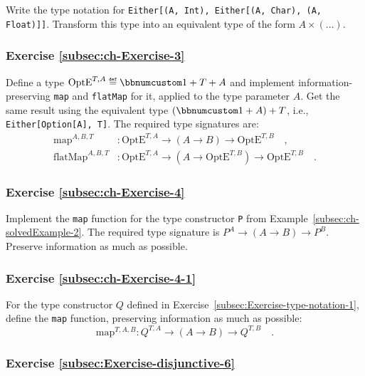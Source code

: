 Write the type notation for \lstinline!Either[(A, Int), Either[(A, Char), (A, Float)]]!.
Transform this type into an equivalent type of the form $A\times(...)$.

\subsubsection{Exercise \label{subsec:ch-Exercise-3}\ref{subsec:ch-Exercise-3}}

Define a type $\text{OptE}^{T,A}\triangleq\bbnum 1+T+A$ and implement
information-preserving \lstinline!map! and \lstinline!flatMap! for
it, applied to the type parameter $A$. Get the same result using
the equivalent type $(\bbnum 1+A)+T$, i.e., \lstinline!Either[Option[A], T]!.
The required type signatures are:
\begin{align*}
\text{map}^{A,B,T} & :\text{OptE}^{T,A}\rightarrow\left(A\rightarrow B\right)\rightarrow\text{OptE}^{T,B}\quad,\\
\text{flatMap}^{A,B,T} & :\text{OptE}^{T,A}\rightarrow(A\rightarrow\text{OptE}^{T,B})\rightarrow\text{OptE}^{T,B}\quad.
\end{align*}


\subsubsection{Exercise \label{subsec:ch-Exercise-4}\ref{subsec:ch-Exercise-4}}

Implement the \lstinline!map! function for the type constructor \lstinline!P!
from Example~\ref{subsec:ch-solvedExample-2}. The required type
signature is $P^{A}\rightarrow\left(A\rightarrow B\right)\rightarrow P^{B}$.
Preserve information as much as possible.

\subsubsection{Exercise \label{subsec:ch-Exercise-4-1}\ref{subsec:ch-Exercise-4-1}}

For the type constructor $Q$ defined in Exercise~\ref{subsec:Exercise-type-notation-1},
define the \lstinline!map! function, preserving information as much
as possible:
\[
\text{map}^{T,A,B}:Q^{T,A}\rightarrow\left(A\rightarrow B\right)\rightarrow Q^{T,B}\quad.
\]


\subsubsection{Exercise \label{subsec:Exercise-disjunctive-6}\ref{subsec:Exercise-disjunctive-6}}

